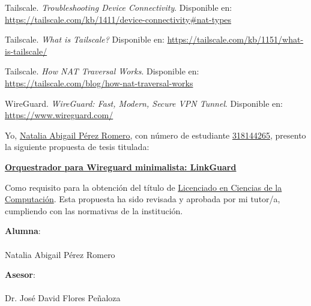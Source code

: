 \documentclass[letterpaper,12pt,oneside]{article}
\begin{document}
\begin{thebibliography}{99}
        Tailscale. \textit{Troubleshooting Device Connectivity}. Disponible en: \url{https://tailscale.com/kb/1411/device-connectivity#nat-types}
        
        Tailscale. \textit{What is Tailscale?} Disponible en: \url{https://tailscale.com/kb/1151/what-is-tailscale/}
        
        Tailscale. \textit{How NAT Traversal Works}. Disponible en: \url{https://tailscale.com/blog/how-nat-traversal-works}
        
        WireGuard. \textit{WireGuard: Fast, Modern, Secure VPN Tunnel}. Disponible en: \url{https://www.wireguard.com/}
        
        \end{thebibliography}


\bigskip

Yo, \underline{Natalia Abigail Pérez Romero}, con número de estudiante \underline{318144265}, presento la siguiente propuesta de tesis titulada:

\vspace{0.5cm}

\begin{center}
\textbf{\underline{Orquestrador para Wireguard minimalista: LinkGuard}}
\end{center}

\vspace{0.5cm}

Como requisito para la obtención del título de \underline{Licenciado en Ciencias de la Computación}. Esta propuesta ha sido revisada y aprobada por mi tutor/a, cumpliendo con las normativas de la institución.

\vspace{1cm}

\noindent
\begin{minipage}{0.5\textwidth}
\textbf{Alumna}: \\
\underline{\hspace{6cm}} \\
Natalia Abigail Pérez Romero \\
\end{minipage}
\hfill
\begin{minipage}{0.5\textwidth}
\textbf{Asesor}: \\
\underline{\hspace{6cm}} \\
Dr. José David Flores Peñaloza \\
\end{minipage}
\end{document}
